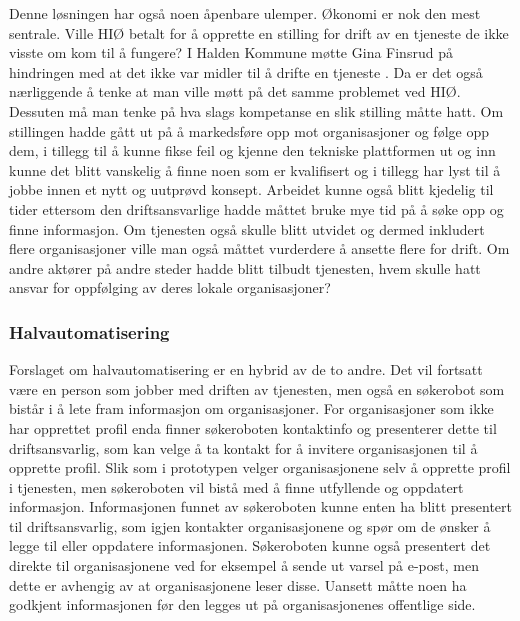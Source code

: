 Denne løsningen har også noen åpenbare ulemper. Økonomi er nok den mest sentrale. Ville HIØ betalt for å opprette en stilling for drift av en tjeneste de ikke visste om kom til å fungere? I Halden Kommune møtte Gina Finsrud på hindringen med at det ikke var midler til å drifte en tjeneste \cite{KOMMUNEN-INTERVJU:20}. Da er det også nærliggende å tenke at man ville møtt på det samme problemet ved HIØ. Dessuten må man tenke på hva slags kompetanse en slik stilling måtte hatt. Om stillingen hadde gått ut på å markedsføre opp mot organisasjoner og følge opp dem, i tillegg til å kunne fikse feil og kjenne den tekniske plattformen ut og inn kunne det blitt vanskelig å finne noen som er kvalifisert og i tillegg har lyst til å jobbe innen et nytt og uutprøvd konsept. Arbeidet kunne også blitt kjedelig til tider ettersom den driftsansvarlige hadde måttet bruke mye tid på å søke opp og finne informasjon. Om tjenesten også skulle blitt utvidet og dermed inkludert flere organisasjoner ville man også måttet vurderdere å ansette flere for drift. Om andre aktører på andre steder hadde blitt tilbudt tjenesten, hvem skulle hatt ansvar for oppfølging av deres lokale organisasjoner?

\subsubsection{Halvautomatisering}
Forslaget om halvautomatisering er en hybrid av de to andre. Det vil fortsatt være en person som jobber med driften av tjenesten, men også en søkerobot som bistår i å lete fram informasjon om organisasjoner. For organisasjoner som ikke har opprettet profil enda finner søkeroboten kontaktinfo og presenterer dette til driftsansvarlig, som kan velge å ta kontakt for å invitere organisasjonen til å opprette profil. Slik som i prototypen velger organisasjonene selv å opprette profil i tjenesten, men søkeroboten vil bistå med å finne utfyllende og oppdatert informasjon. Informasjonen funnet av søkeroboten kunne enten ha blitt presentert til driftsansvarlig, som igjen kontakter organisasjonene og spør om de ønsker å legge til eller oppdatere informasjonen. Søkeroboten kunne også presentert det direkte til organisasjonene ved for eksempel å sende ut varsel på e-post, men dette er avhengig av at organisasjonene leser disse. Uansett måtte noen ha godkjent informasjonen før den legges ut på organisasjonenes offentlige side.

